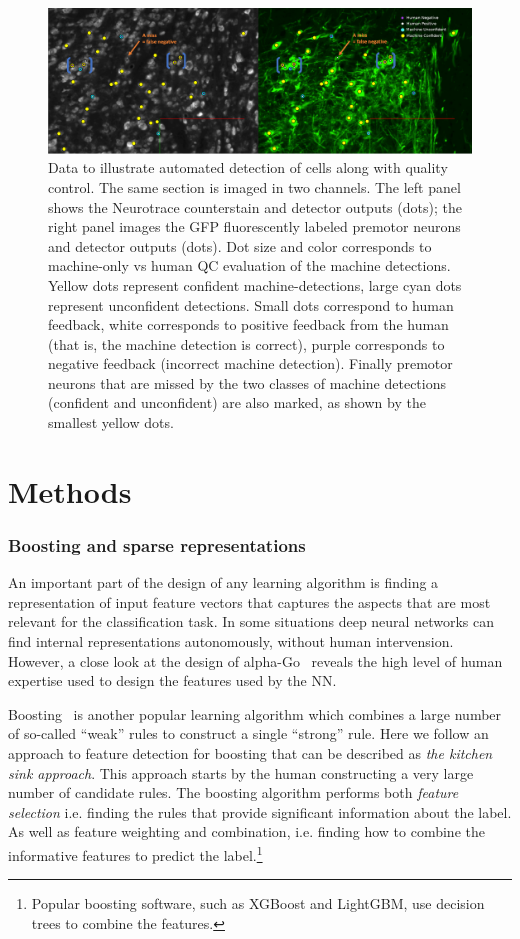\documentclass[11pt]{article}
\begin{document}
\begin{figure}[t]
  \includegraphics[width=\textwidth]{figures/Marked_cell_detections.png}
  \caption{{\small Data to illustrate automated detection of cells along with quality control. The same section is imaged in two channels. The left panel shows the Neurotrace counterstain and detector outputs (dots); the right panel images the GFP fluorescently labeled premotor neurons and detector outputs (dots). Dot size and color corresponds to machine-only vs human QC evaluation of the machine detections. Yellow dots represent confident machine-detections, large cyan dots represent unconfident detections. Small dots correspond to human feedback, white corresponds to positive feedback from the human (that is, the machine detection is correct), purple corresponds to negative feedback (incorrect machine detection). Finally premotor neurons that are missed by the two classes of machine detections (confident and unconfident) are also marked, as shown by the smallest yellow dots.}}
\label{fig:kmeans}
\end{figure}


\section{Methods}
\subsubsection{Boosting and sparse representations}
An important part of the design of any learning algorithm is finding a
representation of input feature vectors that captures the aspects that are
most relevant for the classification task. In some situations deep
neural networks can find internal representations autonomously,
without human intervension. However, a close look at the design of
alpha-Go~\cite{silver2017mastering} reveals the high level of human
expertise used to design the features used by the NN.

Boosting~\cite{FreundSc97,schapire2013boosting} is another popular
learning algorithm which combines a large number of so-called ``weak''
rules to construct a single ``strong'' rule. Here we follow an
approach to feature detection for boosting that can be described as
{\em the kitchen sink approach}. This approach starts by the human
constructing a very large number of candidate rules. The boosting
algorithm performs both {\em feature selection} i.e. finding the rules
that provide significant information about the label. As well as feature weighting and
combination, i.e. finding how to combine the informative features to
predict the label.\footnote{Popular boosting software, such as XGBoost and
  LightGBM, use decision trees to combine the features.}
\end{document}
